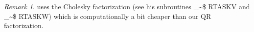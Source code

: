 \documentclass[a4paper,oneside,11pt,DIV=12]{scrartcl}
\makeatletter
\theoremstyle{remark}
\newtheorem*{rem}{Remark}
\newcommand\code{\bgroup\@makeother\_\@makeother\~\@makeother\$\@makeother\^\@codex}
\def\@codex#1{{\normalfont\ttfamily\hyphenchar\font=-1 #1}\egroup}
\makeatother
\begin{document}
\begin{rem}
\citet{marazzi_1987} uses the Cholesky factorization (see his subroutines
\code{RTASKV} and \code{RTASKW}) which is computationally a bit cheaper
than our QR factorization.
\end{rem}

\clearpage


\end{document}
